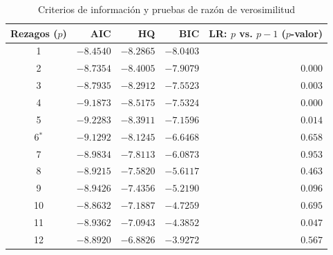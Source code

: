 \begin{table}[H]
\centering
\caption{Criterios de información y pruebas de razón de verosimilitud}
\label{tab:rezagos}
\small
\begin{tabular}{@{}crrrr@{}}
\toprule
Rezagos ($p$) & AIC & HQ & BIC & LR: $p$ vs. $p-1$ ($p$-valor) \\
\midrule
1 & $-8.4540$ & $-8.2865$ & $\mathbf{-8.0403}$ &  \\
2 & $-8.7354$ & $-8.4005$ & $-7.9079$ & $0.000$ \\
3 & $-8.7935$ & $-8.2912$ & $-7.5523$ & $0.003$ \\
4 & $-9.1873$ & $\mathbf{-8.5175}$ & $-7.5324$ & $0.000$ \\
5 & $\mathbf{-9.2283}$ & $-8.3911$ & $-7.1596$ & $0.014$ \\
6$^{*}$ & $-9.1292$ & $-8.1245$ & $-6.6468$ & $0.658$ \\
7 & $-8.9834$ & $-7.8113$ & $-6.0873$ & $0.953$ \\
8 & $-8.9215$ & $-7.5820$ & $-5.6117$ & $0.463$ \\
9 & $-8.9426$ & $-7.4356$ & $-5.2190$ & $0.096$ \\
10 & $-8.8632$ & $-7.1887$ & $-4.7259$ & $0.695$ \\
11 & $-8.9362$ & $-7.0943$ & $-4.3852$ & $0.047$ \\
12 & $-8.8920$ & $-6.8826$ & $-3.9272$ & $0.567$ \\
\bottomrule
\end{tabular}
\end{table}
